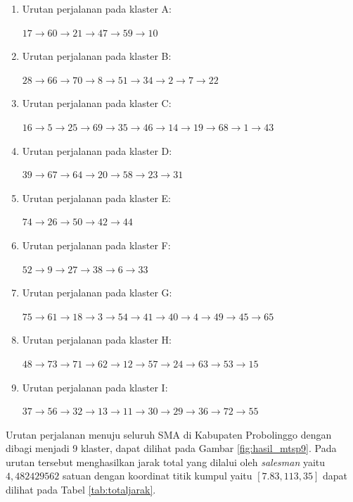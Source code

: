 \begin{enumerate}
\item Urutan perjalanan pada klaster A:

$17\rightarrow60\rightarrow21\rightarrow47\rightarrow59\rightarrow10$

\item Urutan perjalanan pada klaster B:

$28\rightarrow66\rightarrow70\rightarrow8\rightarrow51\rightarrow34\rightarrow2\rightarrow7\rightarrow22$

\item Urutan perjalanan pada klaster C:

$16\rightarrow5\rightarrow25\rightarrow69\rightarrow35\rightarrow46\rightarrow14\rightarrow19\rightarrow68\rightarrow1\rightarrow43$

\item Urutan perjalanan pada klaster D:

$39\rightarrow67\rightarrow64\rightarrow20\rightarrow58\rightarrow23\rightarrow31$

\item Urutan perjalanan pada klaster E:

$74\rightarrow26\rightarrow50\rightarrow42\rightarrow44$

\item Urutan perjalanan pada klaster F:

$52\rightarrow9\rightarrow27\rightarrow38\rightarrow6\rightarrow33$

\item Urutan perjalanan pada klaster G:

$75\rightarrow61\rightarrow18\rightarrow3\rightarrow54\rightarrow41\rightarrow40\rightarrow4\rightarrow49\rightarrow45\rightarrow65$

\item Urutan perjalanan pada klaster H:

$48\rightarrow73\rightarrow71\rightarrow62\rightarrow12\rightarrow57\rightarrow24\rightarrow63\rightarrow53\rightarrow15$

\item Urutan perjalanan pada klaster I:

$37\rightarrow56\rightarrow32\rightarrow13\rightarrow11\rightarrow30\rightarrow29\rightarrow36\rightarrow72\rightarrow55$

\end{enumerate}

Urutan perjalanan menuju seluruh SMA di Kabupaten Probolinggo dengan dibagi menjadi 9 klaster, dapat dilihat pada Gambar \ref{fig:hasil_mtsp9}. Pada urutan tersebut menghasilkan jarak total yang dilalui oleh \textit{salesman} yaitu $4,482429562$ satuan dengan koordinat titik kumpul yaitu $[7.83, 113,35]$ dapat dilihat pada Tabel \ref{tab:totaljarak}.

